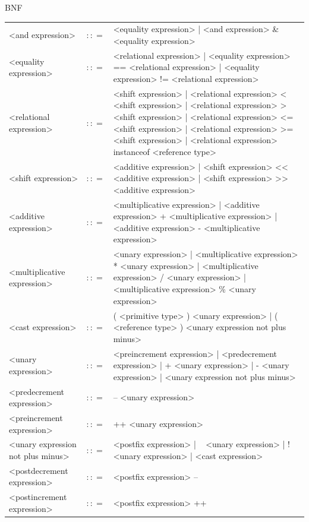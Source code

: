 \documentclass[landscape, 11pt]{article}
\begin{document}
\begin{qsection}{BNF}
\begin{enumerate}[label=\bt{\theenumi.}]
\begin{longtable}{R{7cm} c L{15cm}}
				\\
				<and expression>							&	$\colon\colon=$	&	<equality expression> | <and expression> \& <equality expression>
				\\
				<equality expression>						&	$\colon\colon=$	&	<relational expression> | <equality expression> == <relational expression> | <equality expression> != <relational expression>
				\\
				<relational expression>						&	$\colon\colon=$	&	<shift expression> | <relational expression> < <shift expression> | <relational expression> > <shift expression> | <relational expression> <= <shift expression> | <relational expression> >= <shift expression> | <relational expression> instanceof <reference type>
				\\
				<shift expression>							&	$\colon\colon=$	&	<additive expression> | <shift expression> << <additive expression> | <shift expression> >> <additive expression>
				\\
				<additive expression>						&	$\colon\colon=$	&	<multiplicative expression> | <additive expression> + <multiplicative expression> | <additive expression> - <multiplicative expression>
				\\
				<multiplicative expression>					&	$\colon\colon=$	&	<unary expression> | <multiplicative expression> * <unary expression> | <multiplicative expression> / <unary expression> | <multiplicative expression> \% <unary expression>
				\\
				<cast expression>							&	$\colon\colon=$	&	( <primitive type> ) <unary expression> | ( <reference type> ) <unary expression not plus minus>
				\\
				<unary expression>							&	$\colon\colon=$	&	<preincrement expression> | <predecrement expression> | + <unary expression> | - <unary expression> | <unary expression not plus minus>
				\\
				<predecrement expression>					&	$\colon\colon=$	&	-- <unary expression>
				\\
				<preincrement expression>					&	$\colon\colon=$	&	++ <unary expression>
				\\
				<unary expression not plus minus>			&	$\colon\colon=$	&	<postfix expression> | ~ <unary expression> | ! <unary expression> | <cast expression>
				\\
				<postdecrement expression>					&	$\colon\colon=$	&	<postfix expression> --
				\\
				<postincrement expression>					&	$\colon\colon=$	&	<postfix expression> ++
				\\

\end{longtable}
\end{enumerate}
\end{qsection}
\end{document}
